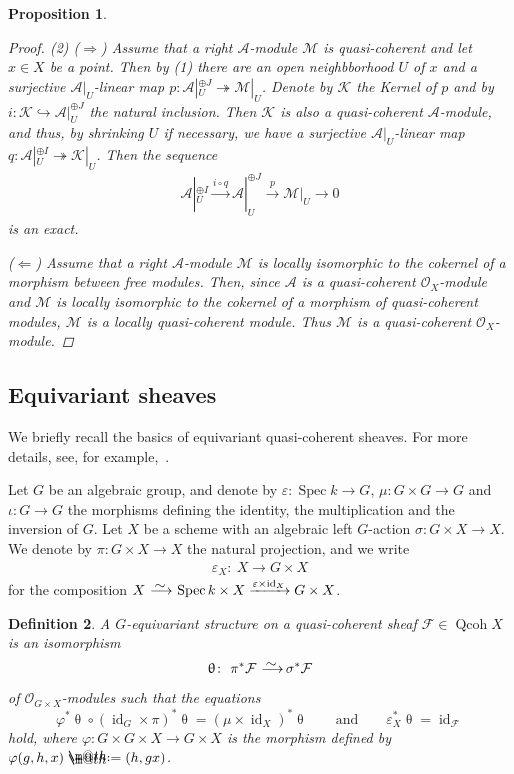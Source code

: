 \documentclass[pdftex]{sigma}%
\makeatletter
\newtheorem{dfn}{Definition}[section]
\newtheorem{prop}[dfn]{Proposition}
\newcommand*{\defeq}{\mathrel{\rlap{%
 \raisebox{0.3ex}{$\m@th\cdot$}}%
 \raisebox{-0.3ex}{$\m@th\cdot$}}%
 =}
\numberwithin{equation}{section}
\newcommand{\Spec}{\operatorname{Spec}}
\newcommand{\Qcoh}{\operatorname{Qcoh}}
\newcommand{\id}{\operatorname{id}}
\newcommand{\cA}{\mathcal{A}}
\newcommand{\cF}{\mathcal{F}}
\newcommand{\cK}{\mathcal{K}}
\newcommand{\cM}{\mathcal{M}}
\newcommand{\cO}{\mathcal{O}}
\newcommand{\simto}{\,\,\,\,\raisebox{4pt}{$\sim$}{\kern -1.1em \longrightarrow}\,}
\newcommand{\hookto}{\hookrightarrow}
\newcommand{\surjto}{\twoheadrightarrow}
\makeatother
\begin{document}
\begin{prop}
\begin{proof}
 (2) ($\Rightarrow$) Assume that a right $\cA$-module $\cM$ is quasi-coherent and let $x\in X$ be a point. Then by (1) there are an open neighbborhood $U$ of $x$ and a surjective $\cA|_U$-linear map $p \colon \cA|_U^{\oplus J}\surjto \cM|_U$. Denote by $\cK$ the Kernel of $p$ and by $i\colon \cK\hookto \cA|_U^{\oplus J}$ the natural inclusion. Then $\cK$ is also a quasi-coherent $\cA$-module, and thus, by shrinking $U$ if necessary, we have a surjective $\cA|_U$-linear map $q \colon \cA|_U^{\oplus I}\surjto \cK|_U$. Then the sequence
 \begin{gather*}
 \cA|_U^{\oplus I}\xrightarrow{i \circ q}\cA|_U^{\oplus J}\xrightarrow{p}\cM|_U\to 0
 \end{gather*}
is an exact.

($\Leftarrow$) Assume that a right $\cA$-module $\cM$ is locally isomorphic to the cokernel of a morphism between free modules. Then, since $\cA$ is a quasi-coherent $\cO_X$-module and $\cM$ is locally isomorphic to the cokernel of a morphism of quasi-coherent modules, $\cM$ is a locally quasi-coherent module. Thus $\cM$ is a quasi-coherent $\cO_X$-module.
 \end{proof}
\end{prop}

\subsection{Equivariant sheaves}\label{equiv section}
We briefly recall the basics of equivariant quasi-coherent sheaves. For more details, see, for example,~\cite[Section~2]{bfk}.

Let $G$ be an algebraic group, and denote by $\varepsilon\colon \Spec k\to G$, $\mu\colon G\times G\to G$ and $\iota\colon G\to G$ the morphisms defining the identity, the multiplication and the inversion of $G$.
Let $X$ be a scheme with an algebraic left $G$-action $\sigma\colon G\times X \to X$. We denote by $\pi\colon G\times X\to X$ the natural projection, and we write
\begin{gather*}
\varepsilon_X\colon\ X\to G\times X
\end{gather*}
for the composition $X\simto \Spec k\times X\xrightarrow{ \varepsilon\times \id_X}G\times X$. \begin{dfn}
A {\it $G$-equivariant structure} on a quasi-coherent sheaf $\cF\in \Qcoh X$ is an isomorphism
\begin{gather*}
\uptheta\colon\ \pi^*\cF\simto \sigma^*\cF
\end{gather*}
of $\cO_{G\times X}$-modules such that the equations
\begin{equation}\label{compati}
\varphi^*\uptheta\circ (\id_G\times\pi)^*\uptheta=(\mu\times\id_X )^*\uptheta \qquad\text{and}\qquad
\varepsilon_X^*\uptheta=\id_{\cF}
\end{equation}
hold, where $\varphi\colon G\times G\times X\to G\times X$ is the morphism defined by $\varphi(g,h,x)\defeq(h,gx)$.
\end{dfn}
\end{document}

